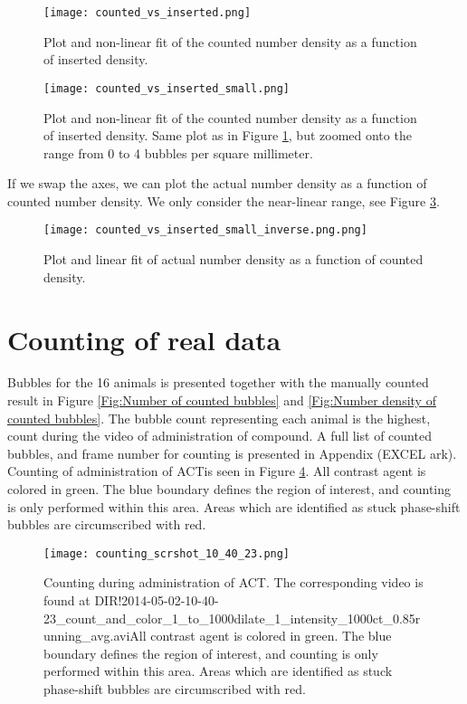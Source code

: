 \begin{figure}[h]
  \centering
  \label{Fig:counted_vs_inserted_all}
  \texttt{[image: counted\_vs\_inserted.png]}
  \caption{Plot and non-linear fit of the counted number density as a function of inserted density.}
\end{figure}


\begin{figure}[h]
  \centering
  \label{Fig:counted_vs_inserted_all_small}
  \texttt{[image: counted\_vs\_inserted\_small.png]}
  \caption{Plot and non-linear fit of the counted number density as a function of inserted density. Same plot as in Figure \ref{Fig:counted_vs_inserted_all}, but zoomed onto the range from 0 to 4 bubbles per square millimeter.}
\end{figure}

If we swap the axes, we can plot the actual number density as a function of counted number density. We only consider the near-linear range, see Figure \ref{Fig:counted_vs_inserted_inverse}. 

\begin{figure}[h]
  \centering
  \label{Fig:counted_vs_inserted_inverse}
  \texttt{[image: counted\_vs\_inserted\_small\_inverse.png.png]}
  \caption{Plot and linear fit of actual number density as a function of counted density.}
\end{figure}

\section{Counting of real data}
Bubbles for the 16 animals is presented together with the manually counted result in Figure \ref{Fig:Number of counted bubbles} and \ref{Fig:Number density of counted bubbles}. The bubble count representing each animal is the highest, count during the video of administration of compound. A full list of counted bubbles, and frame number for counting is presented in Appendix (EXCEL ark). Counting of administration of ACT\textregistered is seen in Figure \ref{Fig:counting_administration}. All contrast agent is colored in green. The blue boundary defines the region of interest, and counting is only performed within this area. Areas which are identified as stuck phase-shift bubbles are circumscribed with red.

\begin{figure}[h]
  \centering
  \label{Fig:counting_administration}
  \texttt{[image: counting\_scrshot\_10\_40\_23.png]}
  \caption{Counting during administration of ACT\textregistered. The corresponding video is found at DIR!2014-05-02-10-40-23_count_and_color_1_to_1000dilate_1_intensity_1000ct_0.85running_avg.aviAll contrast agent is colored in green. The blue boundary defines the region of interest, and counting is only performed within this area. Areas which are identified as stuck phase-shift bubbles are circumscribed with red.}
\end{figure}

